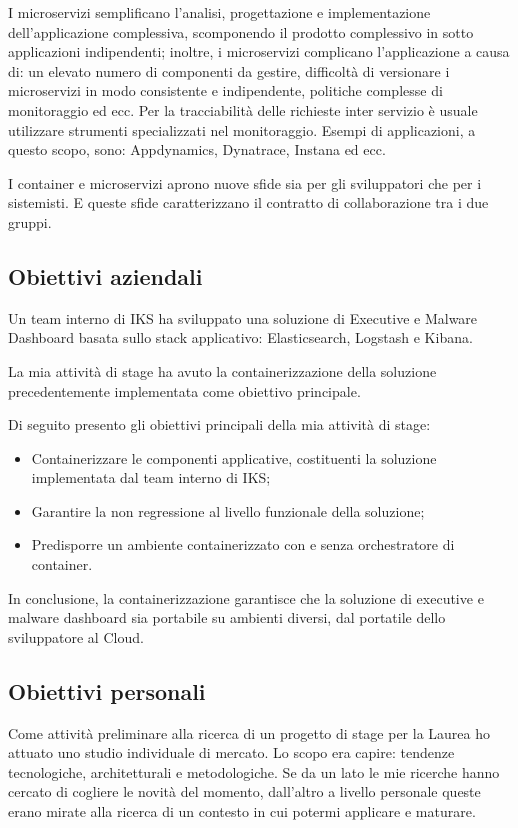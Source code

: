 I microservizi semplificano l'analisi, progettazione e implementazione 
dell'applicazione complessiva, scomponendo il prodotto complessivo in sotto 
applicazioni indipendenti; inoltre, i microservizi complicano l'applicazione a 
causa di: un elevato numero di componenti da gestire, difficoltà di versionare 
i microservizi in modo consistente e indipendente, politiche complesse di 
monitoraggio ed ecc. Per la tracciabilità delle richieste inter servizio è 
usuale utilizzare strumenti specializzati nel monitoraggio. Esempi di 
applicazioni, a questo scopo, sono: Appdynamics, Dynatrace, Instana ed ecc. 

I container e microservizi aprono nuove sfide sia per gli sviluppatori che per 
i sistemisti. E queste sfide caratterizzano il contratto di collaborazione tra 
i due gruppi. 

\subsection{Obiettivi aziendali}

Un team interno di IKS ha sviluppato una soluzione di Executive e Malware 
Dashboard basata sullo stack applicativo: Elasticsearch, Logstash e Kibana.
 
La mia attività di stage ha avuto la containerizzazione della soluzione 
precedentemente implementata come obiettivo principale.

Di seguito presento gli obiettivi principali della mia attività di stage:

\begin{itemize}
	\item Containerizzare le componenti applicative, costituenti la 
          soluzione implementata dal team interno di IKS; 
	\item Garantire la non regressione al livello funzionale della 
          soluzione;
	\item Predisporre un ambiente containerizzato con e senza orchestratore 
          di container.
\end{itemize} 

In conclusione, la containerizzazione garantisce che la soluzione di executive 
e malware dashboard sia portabile su ambienti diversi, dal portatile dello 
sviluppatore al Cloud.  

\subsection{Obiettivi personali}
Come attività preliminare alla ricerca di un progetto di stage per la Laurea ho 
attuato uno studio individuale di mercato. Lo scopo era capire: tendenze 
tecnologiche, architetturali e metodologiche. Se da un lato le mie ricerche 
hanno cercato di cogliere le novità del momento, dall'altro a livello personale 
queste erano mirate alla ricerca di un contesto in cui potermi applicare e 
maturare. 

